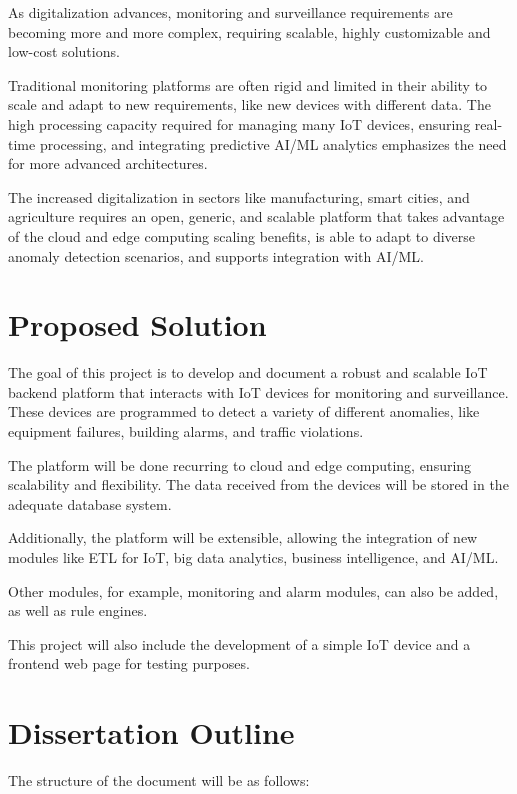As digitalization advances, monitoring and surveillance requirements are
becoming more and more complex, requiring scalable, highly customizable and
low-cost solutions.

Traditional monitoring platforms are often rigid and limited in their ability
to scale and adapt to new requirements, like new devices with different data.
The high processing capacity required for managing many \gls{IoT} devices,
ensuring real-time processing, and integrating predictive \gls{AI}/\gls{ML}
analytics emphasizes the need for more advanced architectures.

The increased digitalization in sectors like manufacturing, smart cities,
and agriculture requires an open, generic, and scalable platform that takes
advantage of the cloud and edge computing scaling benefits, is able to
adapt to diverse anomaly detection scenarios, and supports integration with
\gls{AI}/\gls{ML}.
\section{Proposed Solution}

The goal of this project is to develop and document a robust and scalable
\gls{IoT} backend platform that interacts with \gls{IoT} devices for monitoring and
surveillance. These devices are programmed to detect a variety of different
anomalies, like equipment failures, building alarms, and traffic violations.

The platform will be done recurring to cloud and edge computing, ensuring
scalability and flexibility. The data received from the devices will be stored
in the adequate database system.

Additionally, the platform will be extensible, allowing the integration of new
modules like \gls{ETL} for \gls{IoT}, big data analytics, business intelligence,
and \gls{AI}/\gls{ML}.

Other modules, for example, monitoring and alarm modules, can also be added, as
well as rule engines.

This project will also include the development of a simple IoT device and a
frontend web page for testing purposes.

\section{Dissertation Outline}
The structure of the document will be as follows:

